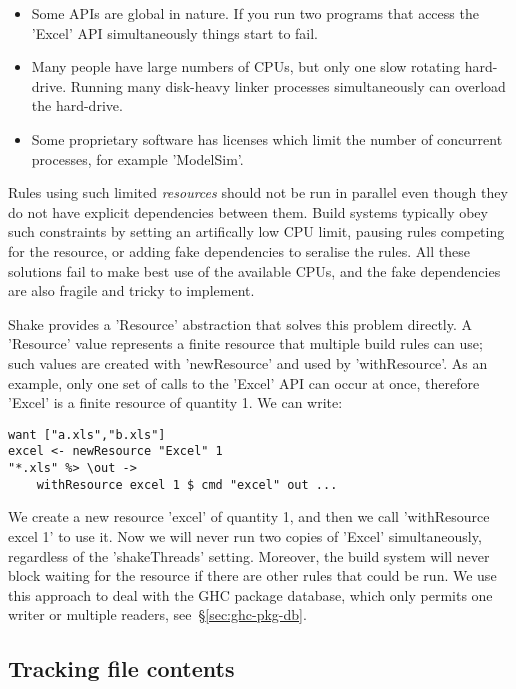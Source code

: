 \begin{itemize}
\item Some APIs are global in nature. If you run two programs that access the
\lst'Excel' API simultaneously things start to fail.
\item Many people have large numbers of CPUs, but only one slow rotating
hard-drive. Running many disk-heavy linker processes simultaneously can overload
the hard-drive.
\item Some proprietary software has licenses which limit the number of
concurrent processes, for example \lst'ModelSim'.
\end{itemize}

\noindent Rules using such limited \emph{resources} should not be run in
parallel even though they do not have explicit dependencies between them. Build systems
typically obey such constraints by setting an artifically low CPU limit, pausing rules
competing for the resource, or adding fake dependencies to seralise the rules.
All these solutions fail to make best use of the available CPUs, and the fake
dependencies are also fragile and tricky to implement.

Shake provides a \lst'Resource' abstraction that solves this problem directly.
A \lst'Resource' value represents a finite resource that multiple build rules can use;
such values are created with \lst'newResource' and used by \lst'withResource'. As an
example, only one set of calls to the \lst'Excel' API can occur at once, therefore
\lst'Excel' is a finite resource of quantity 1. We can write:

\begin{lstlisting}
want ["a.xls","b.xls"]
excel <- newResource "Excel" 1
"*.xls" %> \out ->
    withResource excel 1 $ cmd "excel" out ...
\end{lstlisting}

\noindent We create a new resource \lst'excel' of quantity 1, and then we call
\lst'withResource excel 1' to use it. Now we will never run two copies of
\lst'Excel' simultaneously, regardless of the \lst'shakeThreads' setting.
Moreover, the build system will never block waiting for the resource if there
are other rules that could be run. We use this approach to deal with the GHC
package database, which only permits one writer or multiple readers,
see~\S\ref{sec:ghc-pkg-db}.

\subsection{Tracking file contents\label{sec:file-contents}}


